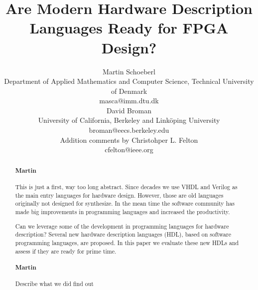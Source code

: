 \documentclass[10pt, technote, draftcls, onecolumn]{IEEEtran}
\newcommand{\comment}[3]{\paragraph*{\textbf{#1}}{\color{#3}#2}}
\newcommand{\martin}[1]{\comment{Martin}{#1}{Blue}}
\newcommand{\cfelton}[1]{\comment{Chris}{#1}{Blue}}
\begin{document}
\newcommand{\shdl} {
  \lstset{keywords={comp,end,def,in,out,if,then,else,true,false,
      int,real,bool,string,int1,int2,int3,int4,int5,int6,int7,int8,
      int16,int32,type}, 
    morecomment=[l]{//},
    morecomment=[s]{/*}{*/}, morestring=[b]{"},
    basicstyle=\ttfamily\small, showstringspaces=false,
    keywordstyle=\bfseries, mathescape=true, }}



\title{Are Modern Hardware Description Languages Ready for FPGA Design?}
\author{Martin Schoeberl\\
Department of Applied Mathematics and Computer Science, 
Technical University of Denmark\\masca@imm.dtu.dk
  \vspace{1ex}\\ 
David Broman\\
University of California, Berkeley and Link{\"o}ping University\\
broman@eecs.berkeley.edu
   \vspace{1ex}\\ 
Addition comments by Christohper L. Felton\\
cfelton@ieee.org
}



\maketitle \thispagestyle{empty}

\begin{abstract}
\martin{This is just a first, way too long abstract.}
Since decades we use VHDL and Verilog as the main entry
languages for hardware design. However, those are old languages
originally not designed for synthesize. In the mean time the software
community has made big improvements in programming languages and
increased the productivity.



Can we leverage some of the development in programming
languages for hardware description? Several new hardware
description languages (HDL), based on software programming
languages, are proposed. In this paper we evaluate these
new HDLs and assess if they are ready for prime time.
\martin{Describe what we did find out}
\end{abstract}
\end{document}
